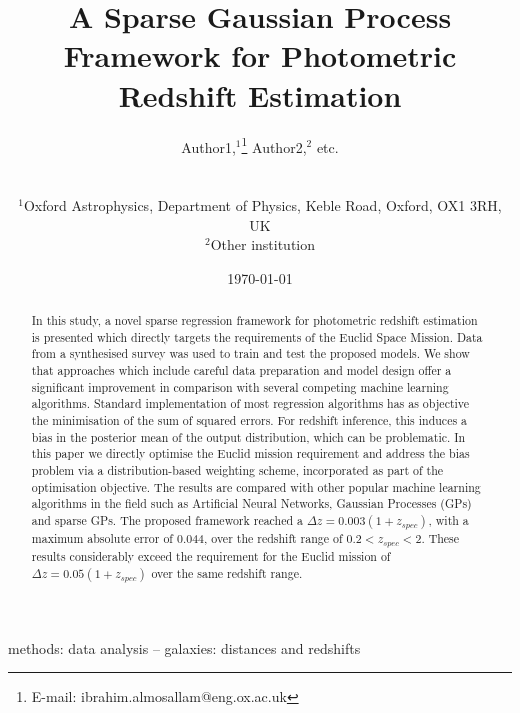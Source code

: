 \documentclass[useAMS,usenatbib,fleqn]{mn2e}
\title[A Sparse Gaussian Process Framework for Photometric Redshift Estimation]{A Sparse Gaussian Process Framework for Photometric Redshift Estimation}
\author[Almosallam et al.]
{\parbox{\textwidth}{Author1,$^1$\thanks{E-mail: ibrahim.almosallam@eng.ox.ac.uk}
Author2,$^{2}$ etc.
}
\vspace{0.4cm}\\
\parbox{\textwidth}{
$^1$Oxford Astrophysics, Department of Physics, Keble Road, Oxford, OX1 3RH, UK\\
$^2$Other institution \\
}}
\begin{document}
\date{\today}

\pagerange{\pageref{firstpage}--\pageref{lastpage}} 

\maketitle

\label{firstpage}

\begin{abstract}
In this study, a novel sparse regression framework for photometric redshift estimation is presented which directly targets the requirements of the Euclid Space Mission. Data from a synthesised survey was used to train and test the proposed models. We show that approaches which include careful data preparation and model design offer a significant improvement in comparison with several competing machine learning algorithms. Standard implementation of most regression algorithms has as objective the minimisation of the sum of squared errors. For redshift inference, this induces a bias in the posterior mean of the output distribution, which can be problematic. In this paper we directly optimise the Euclid mission requirement and address the bias problem via a distribution-based weighting scheme, incorporated as part of the optimisation objective. The results are compared with other popular machine learning algorithms in the field such as Artificial Neural Networks, Gaussian Processes (GPs) and sparse GPs. The proposed framework reached a $\Delta z = 0.003(1+z_{spec})$, with a maximum absolute error of 0.044, over the redshift range of $0.2 < z_{spec} < 2$. These results considerably exceed the requirement for the Euclid mission of $\Delta z = 0.05(1+z_{spec})$ over the same redshift range.

\end{abstract}

\begin{keywords}
methods: data analysis -- galaxies: distances and redshifts
\end{keywords}
\end{document}
